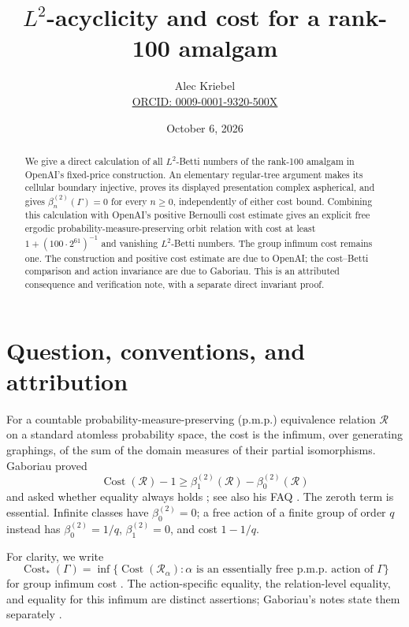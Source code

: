\documentclass[11pt]{article}
\title{$L^2$-acyclicity and cost for a rank-100 amalgam}
\author{Alec Kriebel\\\small\href{https://orcid.org/0009-0001-9320-500X}{ORCID: 0009-0001-9320-500X}}
\date{October 6, 2026}
\newcommand{\Cost}{\operatorname{Cost}}
\newcommand{\betti}[1]{\beta_{#1}^{(2)}}
\newcommand{\RR}{\mathcal R}
\theoremstyle{remark}\newtheorem{remark}[theorem]{Remark}
\begin{document}
\maketitle
\begin{abstract}
We give a direct calculation of all $L^2$-Betti numbers of the rank-100 amalgam in OpenAI's fixed-price construction. An elementary regular-tree argument makes its cellular boundary injective, proves its displayed presentation complex aspherical, and gives $\beta_n^{(2)}(\Gamma)=0$ for every $n\geq0$, independently of either cost bound. Combining this calculation with OpenAI's positive Bernoulli cost estimate gives an explicit free ergodic probability-measure-preserving orbit relation with cost at least $1+(100\cdot2^{61})^{-1}$ and vanishing $L^2$-Betti numbers. The group infimum cost remains one. The construction and positive cost estimate are due to OpenAI; the cost--Betti comparison and action invariance are due to Gaboriau. This is an attributed consequence and verification note, with a separate direct invariant proof.
\end{abstract}

\section{Question, conventions, and attribution}

For a countable probability-measure-preserving (p.m.p.) equivalence relation $\RR$ on a standard atomless probability space, the cost is the infimum, over generating graphings, of the sum of the domain measures of their partial isomorphisms. Gaboriau proved
\begin{equation}\label{eq:comparison}
 \Cost(\RR)-1\geq\betti1(\RR)-\betti0(\RR)
\end{equation}
and asked whether equality always holds \cite[Corollary~3.23 and p.~129]{gab02}; see also his FAQ \cite[p.~1]{faq}. The zeroth term is essential. Infinite classes have $\betti0=0$; a free action of a finite group of order $q$ instead has $\betti0=1/q$, $\betti1=0$, and cost $1-1/q$.

For clarity, we write
\[
 \Cost_*(\Gamma)=\inf\{\Cost(\RR_\alpha):\alpha
       \text{ is an essentially free p.m.p. action of }\Gamma\}
\]
for group infimum cost \cite[Definition~I.5]{gab00}. The action-specific equality, the relation-level equality, and equality for this infimum are distinct assertions; Gaboriau's notes state them separately \cite[Question~2.65]{gabnotes}.
\end{document}
